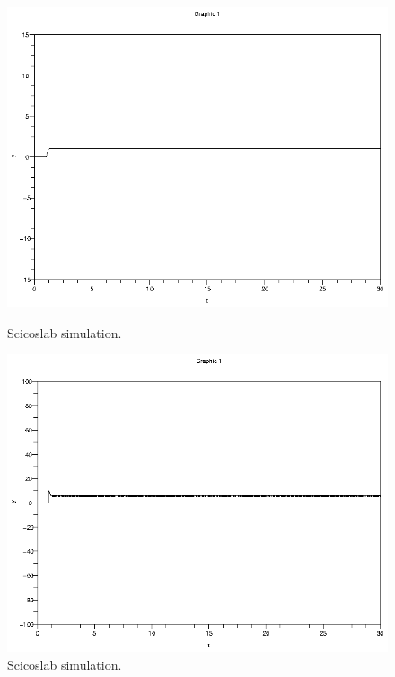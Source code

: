 \documentclass[a4paper,12pt,oneside]{article}
\begin{document}
\begin{figure}
	\centering
	\includegraphics[width=\columnwidth]{../controler/omega.eps}
	\caption{Scicoslab simulation.}
	\label{fig:simulation_omega}
	\centering
	\includegraphics[width=\columnwidth]{../controler/power.eps}
	\caption{Scicoslab simulation.}
	\label{fig:simulation_power}
\end{figure}
\end{document}
